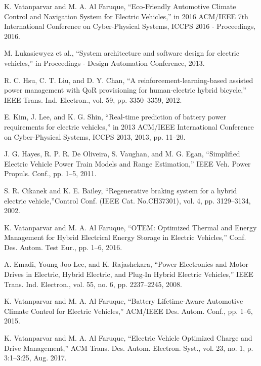 

K. Vatanparvar and M. A. Al Faruque, “Eco-Friendly Automotive Climate Control and Navigation System for Electric Vehicles,” in 2016 ACM/IEEE 7th International Conference on Cyber-Physical Systems, ICCPS 2016 - Proceedings, 2016.

M. Lukasiewycz et al., “System architecture and software design for electric vehicles,” in Proceedings - Design Automation Conference, 2013.

R. C. Hsu, C. T. Liu, and D. Y. Chan, “A reinforcement-learning-based assisted power management with QoR provisioning for human-electric hybrid bicycle,” IEEE Trans. Ind. Electron., vol. 59, pp. 3350–3359, 2012.


E. Kim, J. Lee, and K. G. Shin, “Real-time prediction of battery power requirements for electric vehicles,” in 2013 ACM/IEEE International Conference on Cyber-Physical Systems, ICCPS 2013, 2013, pp. 11–20.

J. G. Hayes, R. P. R. De Oliveira, S. Vaughan, and M. G. Egan, “Simplified Electric Vehicle Power Train Models and Range Estimation,” IEEE Veh. Power Propuls. Conf., pp. 1–5, 2011.

S. R. Cikanek and K. E. Bailey, “Regenerative braking system for a hybrid electric vehicle,”Control Conf. (IEEE Cat. No.CH37301), vol. 4, pp. 3129–3134, 2002.

K. Vatanparvar and M. A. Al Faruque, “OTEM: Optimized Thermal and Energy Management for Hybrid Electrical Energy Storage in Electric Vehicles,” Conf. Des. Autom. Test Eur., pp. 1–6, 2016.

A. Emadi, Young Joo Lee, and K. Rajashekara, “Power Electronics and Motor Drives in Electric, Hybrid Electric, and Plug-In Hybrid Electric Vehicles,” IEEE Trans. Ind. Electron., vol. 55, no. 6, pp. 2237–2245, 2008.

K. Vatanparvar and M. A. Al Faruque, “Battery Lifetime-Aware Automotive Climate Control for Electric Vehicles,” ACM/IEEE Des. Autom. Conf., pp. 1–6, 2015.	

K. Vatanparvar and M. A. Al Faruque, “Electric Vehicle Optimized Charge and Drive Management,” ACM Trans. Des. Autom. Electron. Syst., vol. 23, no. 1, p. 3:1--3:25, Aug. 2017.

